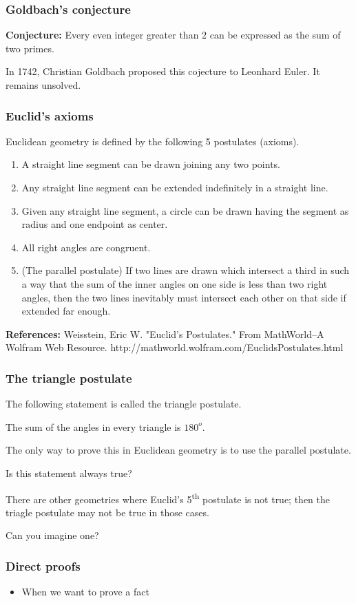 \begin{frame}\frametitle{Goldbach's conjecture}
  \begin{tcolorbox}
    {\bf Conjecture:} Every even integer greater than $2$ can be
    expressed as the sum of two primes.
  \end{tcolorbox}

  In 1742, Christian Goldbach proposed this cojecture to Leonhard
  Euler.  It remains unsolved.
\end{frame}

\begin{frame}\frametitle{Euclid's axioms}
  Euclidean geometry is defined by the following 5 postulates
  (axioms).
  \begin{enumerate}
  \item A straight line segment can be drawn joining any two points.
  \item Any straight line segment can be extended indefinitely in a straight line.
  \item Given any straight line segment, a circle can be drawn having the segment as radius and one endpoint as center.
  \item All right angles are congruent.
  \item (The parallel postulate) If two lines are drawn which
    intersect a third in such a way that the sum of the inner angles
    on one side is less than two right angles, then the two lines
    inevitably must intersect each other on that side if extended far
    enough.
  \end{enumerate}

  {\bf References:} Weisstein, Eric W. "Euclid's Postulates." From
  MathWorld--A Wolfram Web
  Resource. http://mathworld.wolfram.com/EuclidsPostulates.html
\end{frame}

\begin{frame}\frametitle{The triangle postulate}
  The following statement is called the triangle postulate.
  \begin{tcolorbox}
    The sum of the angles in every triangle is $180^{o}$.
  \end{tcolorbox}

  The only way to prove this in Euclidean geometry is to use the
  parallel postulate. \pause

  Is this statement always true? \pause

  There are other geometries where Euclid's 5\textsuperscript{th}
  postulate is not true; then the triagle postulate may not be true in
  those cases.

  Can you imagine one?
\end{frame}

\begin{frame}\frametitle{Direct proofs}
  \begin{itemize}
  \item When we want to prove a fact
  \end{itemize}
\end{frame}

